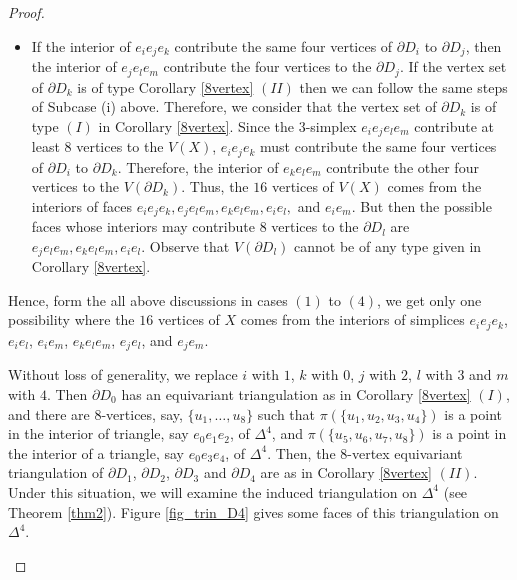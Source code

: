 \documentclass[11pt]{amsart}
\numberwithin{equation}{section}
\theoremstyle{definition}
\begin{document}
\begin{proof}
\begin{itemize}
    \item If the interior of $e_ie_je_k$ contribute the same four vertices of $\partial D_i$ to $\partial D_j$, then the interior of $e_je_le_m$ contribute the four vertices to the $\partial D_j$. If  the vertex set of $\partial D_k$ is of type Corollary \ref{8vertex} $(II)$ then we can follow the same steps of Subcase (i) above. Therefore, we consider that  the vertex set of $\partial D_k$ is of type $(I)$ in Corollary \ref{8vertex}. Since the $3$-simplex $e_ie_je_le_m$ contribute at least $8$ vertices to the $V(X)$, $e_ie_je_k$ must contribute the same four vertices of $\partial D_i$ to $\partial D_k$. Therefore, the interior of $e_ke_le_m$ contribute the other four vertices to the $V(\partial D_k)$. Thus, the $16$ vertices of $V(X)$ comes from the interiors of faces $e_ie_je_k,e_je_le_m,e_ke_le_m,e_ie_l,$ and $e_ie_m$.   
But then the possible faces whose interiors may contribute $8$ vertices to the $\partial D_l$ are $e_je_le_m, e_ke_le_m, e_ie_l $. Observe that $V(\partial D_l)$ cannot be of any type given in Corollary \ref{8vertex}.
\end{itemize}



Hence, form the all above discussions in cases $(1)$ to $(4)$, we get only one possibility where the $16$ vertices of $X$ comes from the interiors of simplices $e_ie_je_k$, $e_ie_l$, $e_ie_m$, $e_ke_le_m$, $e_je_l$, and  $e_je_m$. 

Without loss of generality, we replace $i $ with $1$, $k$ with $0$, $j$ with $2$, $l$ with $3$ and $m$ with $4$. 
Then $\partial D_0$ has an equivariant triangulation as in  Corollary \ref{8vertex} $(I)$, and there are $8$-vertices, say, $\{u_1, \ldots, u_8\}$ such that $\pi(\{u_1, u_2, u_3, u_4\})$ is a point in the interior of triangle, say $e_0e_1e_2$, of $\Delta^4$, and $\pi(\{u_5, u_6, u_7, u_8\})$ is a point in the interior of a triangle, say $e_0e_3e_4$, of $\Delta^4$. Then, the 8-vertex equivariant triangulation of $\partial D_1$, $\partial D_2$, $\partial D_3$ and  $\partial D_4$ are as in Corollary \ref{8vertex} $(II)$. Under this situation, we will examine the induced triangulation on $\Delta^4$ (see Theorem \ref{thm2}). Figure \ref{fig_trin_D4} gives some faces of this triangulation on $\Delta^4$.
\begin{figure}
\end{figure}
\end{proof}
\end{document}
